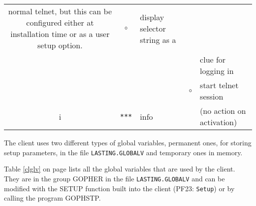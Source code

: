 \begin{table}
\begin{minipage}{\textwidth}
\begin{center}
\begin{tabular}{|c|c|l|cl|}
{normal telnet, but this can be configured either at installation time or
as a user setup option.}        & $\circ$ & display selector string as a    \\
     &        &                 &         & clue for logging in             \\
     &        &                 & $\circ$ & start telnet session            \\
\hline
i    & \verb/***/    & info            & & (no action on activation) \\
\hline
\end{tabular}
\end{center}
\end{minipage}
\end{table}




  The client uses two different types of global variables, permanent
  ones, for storing setup parameters, in the file {\tt LASTING.GLOBALV}
  and temporary ones in memory.
 
 



Table \ref{clglv} on page \pageref{clglv} lists all the
global variables that are used by the client.
They are in the group GOPHER in the file {\tt LASTING.GLOBALV}
and can be modified with the SETUP function built into the
client (PF23: {\tt Setup}) or by calling the program GOPHSTP.

 
